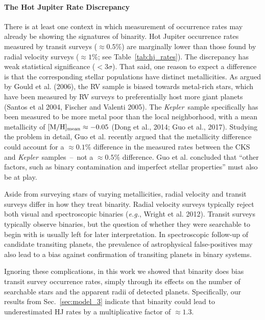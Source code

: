 \paragraph{The Hot Jupiter Rate Discrepancy}
There is at least one context in which measurement of 
occurrence rates may already be showing the signatures of binarity.
Hot Jupiter occurrence rates measured by transit surveys ($\approx 0.5\%$) are 
marginally lower than those found by radial velocity surveys ($\approx 1\%$; 
see Table~\ref{tab:hj_rates}).
The discrepancy has weak statistical significance ($<3\sigma$).
That said, one reason to expect a difference is that the corresponding stellar 
populations have distinct metallicities.
As argued by Gould et al. (2006), the RV sample is biased towards 
metal-rich stars, which have been measured by RV surveys to preferentially 
host more giant planets (Santos et al 2004, Fischer and Valenti 2005).
The {\it Kepler}\ sample specifically has been measured to be more metal poor 
than the local neighborhood, with a mean metallicity of $[{\rm M/H}]_{\rm 
    mean}\approx -0.05$ (Dong et al., 2014; Guo et al., 2017).
Studying the problem in detail, Guo et al. recently argued that the 
metallicity difference could account for a $\approx 0.1\%$ difference in the 
measured rates between the CKS and {\it Kepler}\ samples~--~not a $\approx 
0.5\%$ difference.
Guo et al. concluded that ``other factors, such as binary contamination and 
imperfect stellar properties'' must also be at play.

Aside from surveying stars of varying metallicities, radial velocity and 
transit surveys differ in how they treat binarity.
Radial velocity surveys typically reject both visual and spectroscopic binaries
({\it e.g.}, Wright et al. 2012).
Transit surveys typically observe binaries, but the question of whether they 
were searchable to begin with is usually left for later interpretation.
In spectroscopic follow-up of candidate transiting planets, the prevalence of 
astrophysical false-positives may also lead to a bias against confirmation of 
transiting planets in binary systems.

Ignoring these complications, in this work we showed that
binarity does bias transit survey occurrence rates, simply through its 
effects on the number of searchable stars and the apparent radii of detected 
planets.
Specifically, our results from Sec.~\ref{sec:model_3} indicate that binarity 
could lead to underestimated HJ rates by a multiplicative factor of $\approx 
1.3$.


